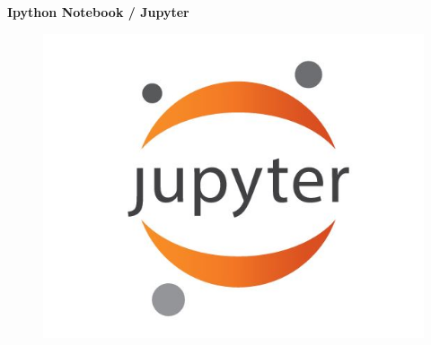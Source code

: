 \documentclass[MASTER.tex]{subfiles}
\begin{document}
\begin{frame}
	\textbf{Ipython Notebook / Jupyter}
	\vspace{-0.4cm}
	\begin{figure}
\centering
\includegraphics[width=1.0\linewidth]{jupyter}

\end{figure}

\end{frame}
	
\end{document}
